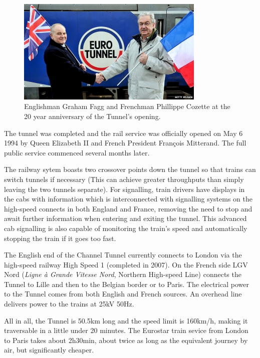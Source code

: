 \documentclass[12pt]{article} %
\begin{document}
\begin{figure}[tp]
  \centering
  \includegraphics[width=0.8\textwidth]{20years}
  \caption{Englishman Graham Fagg and Frenchman Phillippe Cozette at the 20 year anniversary of the Tunnel's opening.}
  \label{fig:20y}
\end{figure}

The tunnel was completed and the rail service was officially opened on May 6 1994 by Queen Elizabeth II and French President François Mitterand. The full public service commenced several months later.

The railway sytem boasts two crossover points down the tunnel so that trains can switch tunnels if necessary (This can achieve greater throughputs than simply leaving the two tunnels separate). For signalling, train drivers have displays in the cabs with information which is interconnected with signalling systems on the high-speed connects in both England and France, removing the need to stop and await further information when entering and exiting the tunnel. This advanced cab signalling is also capable of monitoring the train's speed and automatically stopping the train if it goes too fast.

The English end of the Channel Tunnel currently connects to London via the high-speed railway High Speed 1 (completed in 2007). On the French side LGV Nord (\emph{Ligne à Grande Vitesse Nord}, Northern High-speed Line) connects the Tunnel to Lille and then to the Belgian border or to Paris. The electrical power to the Tunnel comes from both English and French sources. An overhead line delivers power to the trains at 25kV 50Hz.

All in all, the Tunnel is 50.5km long and the speed limit is 160km/h, making it traversable in a little under 20 minutes. The Eurostar train sevice from London to Paris takes about 2h30min, about twice as long as the equivalent journey by air, but significantly cheaper.
\end{document}
